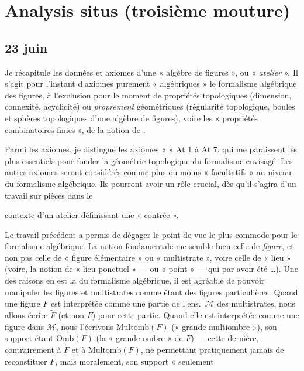 \documentclass[11pt,a4paper]{article}
\begin{document}
\section{Analysis situs (troisième mouture)}


\subsection{23 juin}

Je récapitule les données et axiomes d'une « algèbre de figures », ou « \emph{atelier} ». Il s'agit pour l'instant d'axiomes purement « algébriques »  le formalisme algébrique des figures, à l'exclusion pour le moment de propriétés topologiques (dimension, connexité, acyclicité) ou \emph{proprement} géométriques (régularité topologique, boules et sphères topologiques d'une algèbre de figures), voire les « propriétés combinatoires finies »,  de la notion de .

Parmi les axiomes, je distingue les axiomes «  » At 1 à At 7, qui me paraissent les plus essentiels pour fonder la  géométrie topologique du formalisme envisagé. Les autres axiomes seront considérés comme plus ou moins « facultatifs » au niveau du formalisme algébrique. Ils pourront avoir un rôle crucial, dès qu'il s'agira d'un travail sur pièces dans le

contexte d'un atelier définissant une « contrée ».

Le travail précédent a permis de dégager le point de vue le plus commode pour le formalisme algébrique. La notion fondamentale me semble bien celle de \emph{figure}, et non pas celle de « figure élémentaire » ou « multistrate », voire celle de « lieu » (voire, \ill{} la notion de « lieu ponctuel » — ou « point » \ill{} — qui \ill{} par avoir été \ill{}…). Une des raisons en est la  du formalisme algébrique,  il est agréable de pouvoir manipuler les figures et multistrates comme étant des figures particulières. Quand une figure $F$ est interprétée  comme une partie  de l'ens.\ $\mathcal{M}$ des multistrates, nous allons écrire $\widetilde{F}$ (et non $F$) pour cette partie. Quand elle est interprétée comme une figure  dans $\mathcal{M}$, nous l'écrivons $\mathrm{Multomb}(F)$ (« grande multiombre »), son support étant $\mathrm{Omb}(F)$ (la « grande ombre » de $F$) — cette dernière, contrairement à $\widetilde{F}$ et à $\mathrm{Multomb}(F)$, ne permettant pratiquement jamais de reconstituer $F$, mais moralement, son support « seulement
\end{document}
